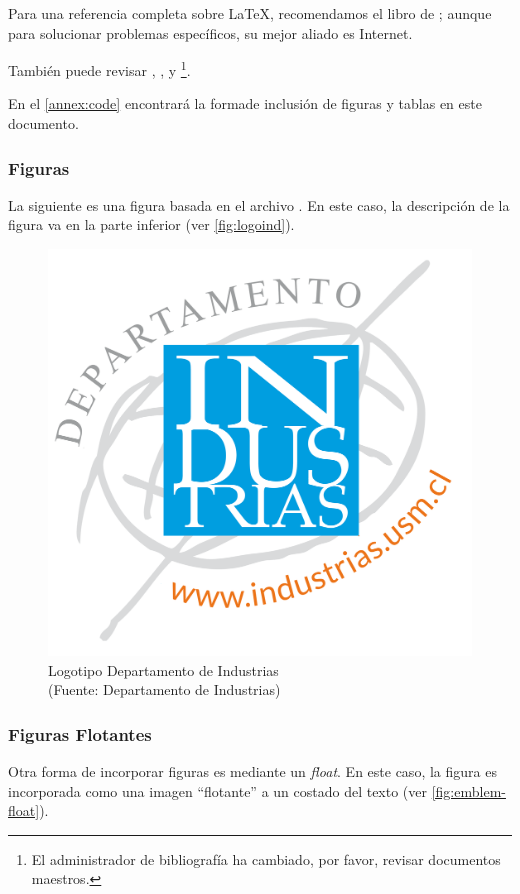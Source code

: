 Para una referencia completa sobre \LaTeX{}, recomendamos el libro de \cite{Lamport94}; aunque para solucionar problemas específicos, su mejor aliado es Internet.

También puede revisar \citet{Roberts05}, \citet{Oetiker06}, y \citet{Mittelbach04}\footnote{El administrador de bibliografía ha cambiado, por favor, revisar documentos maestros.}.

En el \autoref{annex:code} encontrará la formade inclusión de figuras y tablas en este documento.

\subsubsection{Figuras}
La siguiente es una figura basada en el archivo . En este caso, la descripción de la figura va en la parte inferior (ver \autoref{fig:logoind}).

\begin{figure}[ht!]
\centering
\includegraphics[width=.3\textwidth]{figures/logoind.png}
\caption[Logotipo Departamento de Industrias]{Logotipo Departamento de Industrias\\
{\scriptsize (Fuente: Departamento de Industrias)}}
\label{fig:logoind}
\end{figure}


\subsubsection{Figuras Flotantes}

Otra forma de incorporar figuras es mediante un \emph{float}. En este caso, la figura es incorporada como una imagen ``flotante'' a un costado del texto  (ver \autoref{fig:emblem-float}).

